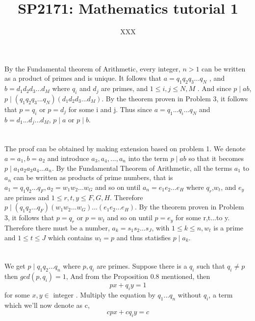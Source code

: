 \documentclass[a4paper,12pt]{article}
\title{SP2171: Mathematics tutorial 1}
\author{XXX}
\begin{document}
\maketitle


\section{}
By the Fundamental theorem of Arithmetic, every integer, $n>1$ can be written as a product of primes and is unique. It follows that $a=q_{1}q_{2}q_{3}...q_{N}$ , and $b=d_{1}d_{2}d_{3}...d_{M}$ where $q_{i}$ and $d_{j}$ are primes, and $1\leq i,j\leq N,M$ . And since $p\mid ab$, $p \mid (q_{1}q_{2}q_{3}...q_{N})(d_{1}d_{2}d_{3}...d_{M})$. By the theorem proven in Problem 3, it follows that $p=q_{i}$ or $p=d_{j}$ for some i and j. Thus since $a=q_1...q_i...q_{N}$ and $b=d_1...d_j...d_{M}$, $p \mid a$ or $p \mid b$.

\section{}
The proof can be obtained by making extension based on problem 1. We denote $a=a_1, b=a_2$ and introduce $a_3, a_4,...,a_n$ into the term $p \mid ab$ so that it becomes $p \mid a_1a_2a_3a_4...a_n$. By the Fundamental Theorem of Arithmetic, all the terms $a_1$ to $a_n$ can be written as products of prime numbers, that is $a_1=q_1q_2...q_F, a_2=w_1w_2...w_G$ and so on until $a_n=e_1e_2...e_H$ where $q_r$,$w_t$, and $e_y$ are primes and $1\leq r,t,y\leq F,G,H$. Therefore $p \mid (q_1q_2...q_F)(w_1w_2...w_G)...(e_1e_2...e_H)$. By the theorem proven in Problem 3, it follows that $p=q_{r}$ or $p=w_{t}$ and so on until $p=e_y$ for some r,t...to y. Therefore there must be a number, $a_k=s_1s_2...s_J$, with $1\leq k\leq n, w_t$ is a prime and $1\leq t\leq J$ which contains $w_t=p$ and thus statisfies $p \mid a_k$.

\section{}
We get $p \mid q_1q_2...q_n$ where $p,q_i$ are primes. Suppose there is a $q_i$ such that $q_i\neq p$ then $gcd(p,q_i)=1$, And from the Proposition 0.8 mentioned, then
\begin{equation} px+q_iy=1 \end {equation} for some $x,y\in$ integer . Multiply the equation by $q_1...q_n$ without $q_i$, a term which we'll now denote as c, \begin{equation} cpx+cq_iy=c \end{equation}
\end{document}
